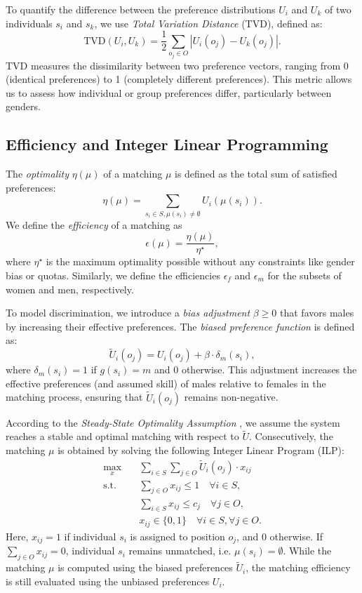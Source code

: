 \documentclass[letterpaper]{article}
\begin{document}
To quantify the difference between the preference distributions \( U_i \) and \( U_k \) of two individuals \( s_i \) and \( s_k \), we use \textit{Total Variation Distance} (TVD), defined as:
\[
\text{TVD}(U_i, U_k) = \frac{1}{2} \sum_{o_j \in O} \left| U_i(o_j) - U_k(o_j) \right|.
\]
TVD measures the dissimilarity between two preference vectors, ranging from 0 (identical preferences) to 1 (completely different preferences). This metric allows us to assess how individual or group preferences differ, particularly between genders.

\subsection*{Efficiency and Integer Linear Programming}

The \textit{optimality} \( \eta(\mu) \) of a matching \( \mu \) is defined as the total sum of satisfied preferences:
\[
\eta(\mu) = \sum_{s_i \in S, \mu(s_i) \neq \emptyset} U_i(\mu(s_i)).
\]
We define the \textit{efficiency} of a matching as
\[
\epsilon(\mu)=\frac{\eta(\mu)}{\eta^{\star}},
\]
where \(\eta^{\star}\) is the maximum optimality possible without any constraints like gender bias or quotas. Similarly, we define the efficiencies \( \epsilon_f \) and \( \epsilon_m\) for the subsets of women and men, respectively.

To model discrimination, we introduce a \textit{bias adjustment} \( \beta \geq 0 \) that favors males by increasing their effective preferences. The \textit{biased preference function} is defined as:
\[
\tilde{U}_i(o_j) = U_i(o_j) + \beta \cdot \delta_m(s_i),
\]
where \( \delta_m(s_i) = 1 \) if \( g(s_i) = m \) and \( 0 \) otherwise. This adjustment increases the effective preferences (and assumed skill) of males relative to females in the matching process, ensuring that \( \tilde{U}_i(o_j) \) remains non-negative.


According to the \textit{Steady-State Optimality Assumption} \cite{lawrence2020}, we assume the system reaches a stable and optimal matching with respect to \( \tilde{U} \). Consecutively, the matching \( \mu \) is obtained by solving the following Integer Linear Program (ILP):
\begin{align*}
\max_{x} \quad & \sum_{i \in S} \sum_{j \in O} \tilde{U}_i(o_j) \cdot x_{ij} \\
\text{s.t.} \quad & \sum_{j \in O} x_{ij} \leq 1 \quad \forall i \in S, \\
& \sum_{i \in S} x_{ij} \leq c_j \quad \forall j \in O, \\
& x_{ij} \in \{0, 1\} \quad \forall i \in S, \forall j \in O.
\end{align*}
Here, \( x_{ij} = 1 \) if individual \( s_i \) is assigned to position \( o_j \), and \( 0 \) otherwise. If \( \sum_{j \in O} x_{ij} = 0 \), individual \( s_i \) remains unmatched, i.e. \(\mu(s_i) = \emptyset\). While the matching \( \mu \) is computed using the biased preferences \( \tilde{U}_i \), the matching efficiency is still evaluated using the unbiased preferences \( U_i \).
\end{document}
